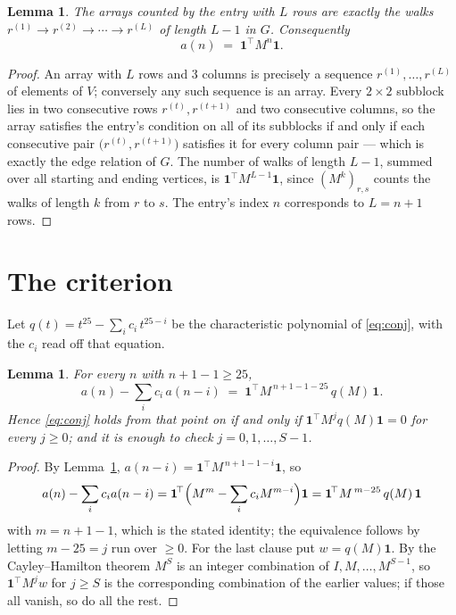 \documentclass[11pt,a4paper]{article}
\theoremstyle{plain}
\newtheorem{lemma}[theorem]{Lemma}
\theoremstyle{definition}
\begin{document}
\begin{lemma}\label{lem:walk}
The arrays counted by the entry with $L$ rows are exactly the walks
$r^{(1)}\to r^{(2)}\to\cdots\to r^{(L)}$ of length $L-1$ in $G$. Consequently
\[
a(n)\;=\;\mathbf{1}^{\!\top}M^{n}\mathbf{1} .
\]
\end{lemma}

\begin{proof}
An array with $L$ rows and $3$ columns is precisely a sequence
$r^{(1)},\dots,r^{(L)}$ of elements of $V$; conversely any such sequence is an array.
Every $2\times2$ subblock lies in two consecutive rows $r^{(t)},r^{(t+1)}$ and two
consecutive columns, so the array satisfies the entry's condition on all of its subblocks
if and only if each consecutive pair $\bigl(r^{(t)},r^{(t+1)}\bigr)$ satisfies it for
every column pair --- which is exactly the edge relation of $G$. The number of walks of
length $L-1$, summed over all starting and ending vertices, is
$\mathbf{1}^{\!\top}M^{L-1}\mathbf{1}$, since $(M^{k})_{r,s}$ counts the walks of
length $k$ from $r$ to $s$. The entry's index $n$ corresponds to $L=n+1$ rows.
\end{proof}

\section{The criterion}

Let $q(t)=t^{25}-\sum_i c_i\,t^{25-i}$ be the characteristic polynomial of
\eqref{eq:conj}, with the $c_i$ read off that equation.

\begin{lemma}\label{lem:crit}
For every $n$ with $n+1-1\ge25$,
\[
a(n)-\sum_i c_i\,a(n-i)\;=\;\mathbf{1}^{\!\top}M^{\,n+1-1-25}\,q(M)\,\mathbf{1} .
\]
Hence \eqref{eq:conj} holds from that point on if and only if
$\mathbf{1}^{\!\top}M^{j}q(M)\mathbf{1}=0$ for every $j\ge0$; and it is enough to check
$j=0,1,\dots,S-1$.
\end{lemma}

\begin{proof}
By Lemma~\ref{lem:walk}, $a(n-i)=\mathbf{1}^{\!\top}M^{\,n+1-1-i}\mathbf{1}$, so
\[
a(n)-\sum_i c_i a(n-i)
=\mathbf{1}^{\!\top}\Bigl(M^{m}-\sum_i c_i M^{m-i}\Bigr)\mathbf{1}
=\mathbf{1}^{\!\top}M^{\,m-25}\,q(M)\,\mathbf{1}
\]
with $m=n+1-1$, which is the stated identity; the equivalence follows by letting
$m-25=j$ run over $\ge0$. For the last clause put $w=q(M)\mathbf{1}$. By the
Cayley--Hamilton theorem $M^{S}$ is an integer combination of $I,M,\dots,M^{S-1}$, so
$\mathbf{1}^{\!\top}M^{j}w$ for $j\ge S$ is the corresponding combination of the earlier
values; if those all vanish, so do all the rest.
\end{proof}
\end{document}
